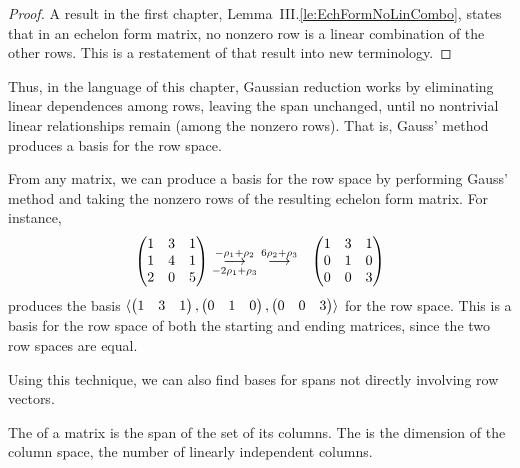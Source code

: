 \begin{proof}
A result in the first chapter, Lemma~III.\ref{le:EchFormNoLinCombo},
states that in an echelon form matrix, no nonzero row is
a linear combination of the other rows.
This is a restatement of that result into new terminology.
\end{proof}

Thus, in the language of this chapter,
Gaussian reduction works by eliminating linear dependences among rows, 
leaving the span unchanged, until no 
nontrivial linear relationships remain (among the nonzero rows).
That is, Gauss' method produces a basis for the row space.

\begin{example}
From any matrix, we can produce a basis for the row space by
performing Gauss' method and taking the nonzero rows of the resulting
echelon form matrix.
For instance,
\begin{eqnarray*}
  \begin{pmatrix}
    1  &3  &1  \\
    1  &4  &1  \\
    2  &0  &5
  \end{pmatrix}
  &\grstep[-2\rho_1+\rho_3]{-\rho_1+\rho_2}
  \;\grstep{6\rho_2+\rho_3}
  &\begin{pmatrix}
    1  &3  &1  \\
    0  &1  &0  \\
    0  &0  &3
  \end{pmatrix}
\end{eqnarray*}
produces the basis $\sequence{\rowvec{1 &3 &1},
            \rowvec{0 &1 &0},
            \rowvec{0 &0 &3} }$ for the row space.
This is a basis for the row space of both the starting and ending matrices, 
since the two row spaces are equal.
\end{example}

Using this technique, we can also find bases for spans 
not directly involving row vectors.

\begin{definition}
The 
of a matrix is the span of the set of its columns.
The 
is the dimension of the column space, the number of linearly independent
columns.
\end{definition}

